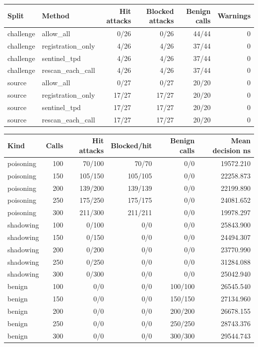 \begin{tabular}{llrrrr}
Split & Method & Hit attacks & Blocked attacks & Benign calls & Warnings \\
\hline
challenge & allow\_all & 0/26 & 0/26 & 44/44 & 0 \\
challenge & registration\_only & 4/26 & 4/26 & 37/44 & 0 \\
challenge & sentinel\_tpd & 4/26 & 4/26 & 37/44 & 0 \\
challenge & rescan\_each\_call & 4/26 & 4/26 & 37/44 & 0 \\
source & allow\_all & 0/27 & 0/27 & 20/20 & 0 \\
source & registration\_only & 17/27 & 17/27 & 20/20 & 0 \\
source & sentinel\_tpd & 17/27 & 17/27 & 20/20 & 0 \\
source & rescan\_each\_call & 17/27 & 17/27 & 20/20 & 0 \\
\end{tabular}

\begin{tabular}{lrrrrr}
Kind & Calls & Hit attacks & Blocked/hit & Benign calls & Mean decision ns \\
\hline
poisoning & 100 & 70/100 & 70/70 & 0/0 & 19572.210 \\
poisoning & 150 & 105/150 & 105/105 & 0/0 & 22258.873 \\
poisoning & 200 & 139/200 & 139/139 & 0/0 & 22199.890 \\
poisoning & 250 & 175/250 & 175/175 & 0/0 & 24081.652 \\
poisoning & 300 & 211/300 & 211/211 & 0/0 & 19978.297 \\
shadowing & 100 & 0/100 & 0/0 & 0/0 & 25843.900 \\
shadowing & 150 & 0/150 & 0/0 & 0/0 & 24494.307 \\
shadowing & 200 & 0/200 & 0/0 & 0/0 & 23770.990 \\
shadowing & 250 & 0/250 & 0/0 & 0/0 & 31284.088 \\
shadowing & 300 & 0/300 & 0/0 & 0/0 & 25042.940 \\
benign & 100 & 0/0 & 0/0 & 100/100 & 26545.540 \\
benign & 150 & 0/0 & 0/0 & 150/150 & 27134.960 \\
benign & 200 & 0/0 & 0/0 & 200/200 & 26678.155 \\
benign & 250 & 0/0 & 0/0 & 250/250 & 28743.376 \\
benign & 300 & 0/0 & 0/0 & 300/300 & 29544.743 \\
\end{tabular}


